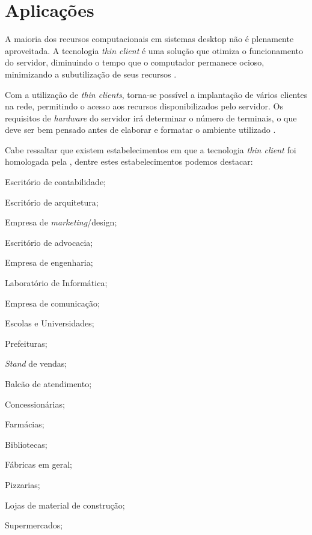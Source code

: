 \documentclass[
	12pt,				%
	openright,			%
	twoside,			%
	a4paper,			%
	chapter=TITLE,		%
	english,			%
	brazil				%
	]{abntex2}
\begin{document}
\newpage







\section{Aplicações}

A maioria dos recursos computacionais em sistemas desktop não é plenamente aproveitada. A tecnologia \textit{thin client} é uma solução que otimiza o funcionamento do servidor, diminuindo o tempo que o computador permanece ocioso, minimizando a subutilização de seus recursos \cite{thinclientbrasil}. 

Com a utilização de \textit{thin clients}, torna-se possível a implantação de vários clientes na rede, permitindo o acesso aos recursos disponibilizados pelo servidor. Os requisitos de \textit{hardware} do servidor irá determinar o número de terminais, o que deve ser bem pensado antes de elaborar e formatar o ambiente utilizado \cite{thinclientbrasil}. 

Cabe ressaltar que existem estabelecimentos em que a tecnologia \textit{thin client} foi homologada pela , dentre estes estabelecimentos podemos destacar:


\begin{alineas}
\item Escritório de contabilidade;
\item Escritório de arquitetura;
\item Empresa de \textit{marketing}/design;
\item Escritório de advocacia;
\item Empresa de engenharia;
\item Laboratório de Informática;
\item Empresa de comunicação;
\item Escolas e Universidades;
\item Prefeituras;
\item \textit{Stand} de vendas;
\item Balcão de atendimento;
\item Concessionárias;
\item Farmácias;
\item Bibliotecas;
\item Fábricas em geral;
\item Pizzarias;
\item Lojas de material de construção;
\item Supermercados;
\end{alineas}
\end{document}
